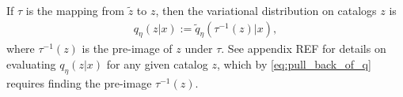 


If $\tau$ is the mapping from $\tilde z$ to $z$, 
then the variational distribution on catalogs $z$ is
\begin{align}
    q_\eta(z | x) := \tilde q_\eta(\tau^{-1}(z) | x),
    \label{eq:pull_back_of_q}
\end{align}
where $\tau^{-1}(z)$ is the pre-image of $z$ under $\tau$. 
See appendix REF for details on evaluating $q_\eta(z | x)$ for any given catalog $z$, which by \eqref{eq:pull_back_of_q} requires finding the pre-image $\tau^{-1}(z)$.




